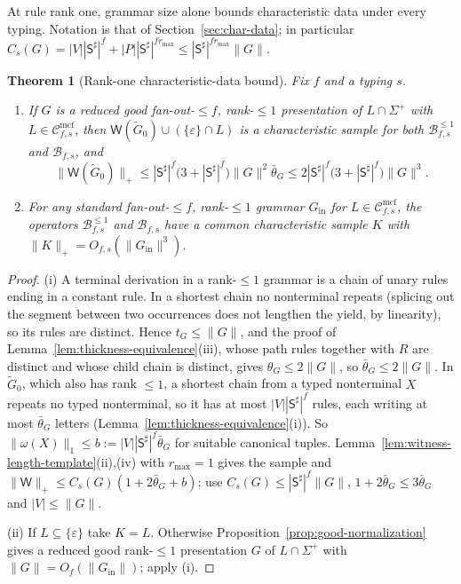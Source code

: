 \documentclass[11pt]{article}
\numberwithin{equation}{section}
\theoremstyle{plain}
\newtheorem{theorem}{Theorem}[section]
\theoremstyle{definition}
\theoremstyle{remark}
\newcommand{\Wit}{\mathsf{W}}
\newcommand{\Cmcf}[2]{\mathcal{C}^{\mathrm{mcf}}_{#1,#2}}
\newcommand{\eps}{\varepsilon}
\begin{document}
At rule rank one, grammar size alone bounds characteristic data under every
typing.  Notation is that of Section~\ref{sec:char-data}; in particular
$C_s(G)=|V||\mathsf S^\sharp|^f+|P||\mathsf S^\sharp|^{fr_{\max}}\le
|\mathsf S^\sharp|^{fr_{\max}}\|G\|$.

\begin{theorem}[Rank-one characteristic-data bound]
\label{thm:rankone-polydata}
Fix $f$ and a typing $s$.
\begin{enumerate}[label=\textup{(\roman*)},leftmargin=*]
\item If $G$ is a reduced good fan-out-$\le f$, rank-$\le1$ presentation of
$L\cap\Sigma^+$ with $L\in\Cmcf{f}{s}$, then
$\Wit(\widetilde G_0)\cup(\{\eps\}\cap L)$ is a characteristic sample for both
$\mathcal B^{\le1}_{f,s}$ and $\mathcal B_{f,s}$, and
\[
 \|\Wit(\widetilde G_0)\|_+\le|\mathsf S^\sharp|^f\bigl(3+|\mathsf S^\sharp|^f\bigr)
 \|G\|^2\bar\theta_G
 \le2|\mathsf S^\sharp|^f\bigl(3+|\mathsf S^\sharp|^f\bigr)\|G\|^3 .
\]
\item For any standard fan-out-$\le f$, rank-$\le1$ grammar $G_{\mathrm{in}}$ for
$L\in\Cmcf{f}{s}$, the operators $\mathcal B^{\le1}_{f,s}$ and $\mathcal B_{f,s}$
have a common characteristic sample $K$ with $\|K\|_+=O_{f,s}(\|G_{\mathrm{in}}\|^3)$.
\end{enumerate}
\end{theorem}

\begin{proof}
(i) A terminal derivation in a rank-$\le1$ grammar is a chain of unary rules
ending in a constant rule.  In a shortest chain no nonterminal repeats (splicing
out the segment between two occurrences does not lengthen the yield, by
linearity), so its rules are distinct.  Hence $t_G\le\|G\|$, and the proof of
Lemma~\ref{lem:thickness-equivalence}(iii), whose path rules together with $R$ are
distinct and whose child chain is distinct, gives $\theta_G\le2\|G\|$, so
$\bar\theta_G\le2\|G\|$.  In $\widetilde G_0$, which also has rank $\le1$, a shortest
chain from a typed nonterminal $X$ repeats no typed nonterminal, so it has at
most $|V||\mathsf S^\sharp|^f$ rules, each writing at most $\bar\theta_G$
letters (Lemma~\ref{lem:thickness-equivalence}(i)).  So
$\|\omega(X)\|_1\le b:=|V||\mathsf S^\sharp|^f\bar\theta_G$ for suitable canonical
tuples.  Lemma~\ref{lem:witness-length-template}(ii),(iv) with $r_{\max}=1$ gives
the sample and
$\|\Wit\|_+\le C_s(G)(1+2\bar\theta_G+b)$; use
$C_s(G)\le|\mathsf S^\sharp|^f\|G\|$, $1+2\bar\theta_G\le3\bar\theta_G$ and
$|V|\le\|G\|$.

(ii) If $L\subseteq\{\eps\}$ take $K=L$.  Otherwise
Proposition~\ref{prop:good-normalization} gives a reduced good rank-$\le1$
presentation $G$ of $L\cap\Sigma^+$ with $\|G\|=O_f(\|G_{\mathrm{in}}\|)$; apply (i).
\end{proof}
\end{document}
